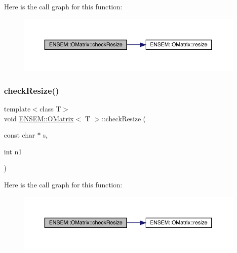 Here is the call graph for this function\+:
\nopagebreak
\begin{figure}[H]
\begin{center}
\leavevmode
\includegraphics[width=350pt]{dd/d80/classENSEM_1_1OMatrix_a04fb9c7a5ca8da8a54aff3a8bafec571_cgraph}
\end{center}
\end{figure}
\mbox{\label{classENSEM_1_1OMatrix_a04fb9c7a5ca8da8a54aff3a8bafec571}} 
\subsubsection{\texorpdfstring{checkResize()}{checkResize()}\hspace{0.1cm}{\footnotesize\ttfamily [3/9]}}
{\footnotesize\ttfamily template$<$class T$>$ \\
void \mbox{\hyperlink{classENSEM_1_1OMatrix}{E\+N\+S\+E\+M\+::\+O\+Matrix}}$<$ T $>$\+::check\+Resize (\begin{DoxyParamCaption}\item[{const char $\ast$}]{s,  }\item[{int}]{n1 }\end{DoxyParamCaption})\hspace{0.3cm}{\ttfamily [inline]}}

Here is the call graph for this function\+:
\nopagebreak
\begin{figure}[H]
\begin{center}
\leavevmode
\includegraphics[width=350pt]{dd/d80/classENSEM_1_1OMatrix_a04fb9c7a5ca8da8a54aff3a8bafec571_cgraph}
\end{center}
\end{figure}
\mbox{\label{classENSEM_1_1OMatrix_aa9d9ff7da2027f85535b36b472ef125b}} 
